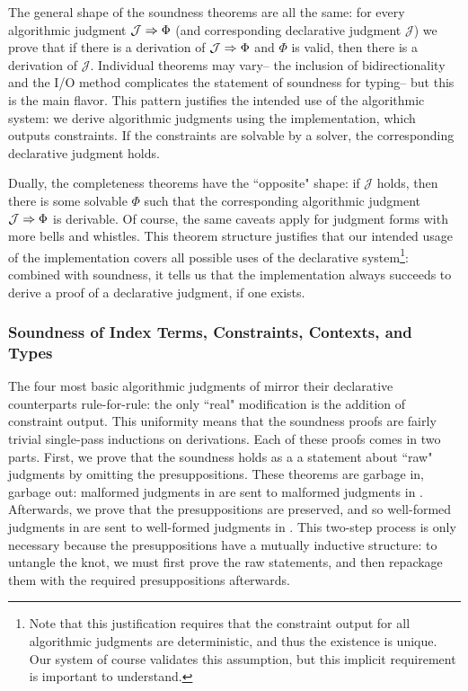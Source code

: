 The general shape of the soundness theorems are all the same: for every algorithmic judgment $\mathcal{J} \Rightarrow \Phi$ (and corresponding declarative judgment $\mathcal{J}$) we prove that if there is a derivation of $\mathcal{J} \Rightarrow \Phi$ and $\Phi$ is valid, then there is a derivation of $\mathcal{J}$. Individual theorems may vary-- the inclusion of bidirectionality and the I/O method complicates the statement of soundness for typing-- but this is the main flavor. This pattern justifies the intended use of the algorithmic system: we derive algorithmic judgments using the implementation, which outputs constraints. If the constraints are solvable by a solver, the corresponding declarative judgment holds.

Dually, the completeness theorems have the ``opposite" shape: if $\mathcal{J}$ holds, then there is some solvable $\Phi$ such that the corresponding algorithmic judgment $\mathcal{J} \Rightarrow \Phi$ is derivable. Of course, the same caveats apply for judgment forms with more bells and whistles. This theorem structure justifies that our intended usage of the implementation covers all possible uses of the declarative system\footnote{Note that this justification requires that the constraint output for all algorithmic judgments are deterministic, and thus the existence is unique. Our system of course validates this assumption, but this implicit requirement is important to understand.}: combined with soundness, it tells us that the implementation always succeeds to derive a proof of a declarative judgment, if one exists.

\subsubsection{Soundness of Index Terms, Constraints, Contexts, and Types}
The four most basic algorithmic judgments of \bilambdaamor mirror their declarative counterparts rule-for-rule: the only ``real" modification is the addition of constraint output. This uniformity means that the soundness proofs are fairly trivial single-pass inductions on derivations. Each of these proofs comes in two parts. First, we prove that the soundness holds as a a statement about ``raw" judgments by omitting the presuppositions. These theorems are garbage in, garbage out: malformed judgments in \bilambdaamor are sent to malformed judgments in \dlambdaamor. Afterwards, we prove that the presuppositions are preserved, and so well-formed judgments in \bilambdaamor are sent to well-formed judgments in \dlambdaamor. This two-step process is only necessary because the presuppositions have a mutually inductive structure: to untangle the knot, we must first prove the raw statements, and then repackage them with the required presuppositions afterwards.


